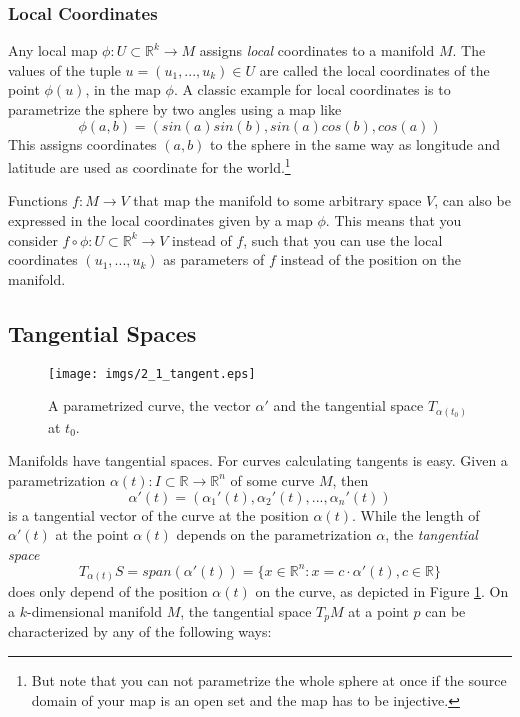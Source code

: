 \subsubsection{Local Coordinates}

Any local map $\phi: U \subset \mathbb R^k \rightarrow M$ assigns \emph{local} coordinates to a manifold $M$. The values of the tuple $u=(u_1,...,u_k)\in U$ are called the local coordinates of the point $\phi(u)$, in the map $\phi$. A classic example for local coordinates is to parametrize the sphere by two angles using a map like
\[\phi(a,b) = (sin(a)sin(b), sin(a)cos(b), cos(a))\]
This assigns coordinates $(a,b)$ to the sphere in the same way as longitude and latitude are used as coordinate for the world.\footnote{But note that you can not parametrize the whole sphere at once if the source domain of your map is an open set and the map has to be injective.}

Functions $f:M \rightarrow V$ that map the manifold to some arbitrary space $V$, can also be expressed in the local coordinates given by  a map $\phi$. This means that you consider $f \circ \phi : U \subset \mathbb R^k \rightarrow V$ instead of $f$, such that you can use the local coordinates $(u_1,...,u_k)$ as parameters of $f$ instead of the position on the manifold. %

	
\subsection{Tangential Spaces}		
\begin{figure}[tb]
\begin{center}
\texttt{[image: imgs/2\_1\_tangent.eps]}
\end{center}
\caption{A parametrized curve, the vector $\alpha'$ and the tangential space $T_{\alpha(t_0)}$ at $t_0$.}
\label{fig::2_1_paramCurve}
\end{figure}


Manifolds have tangential spaces.
For curves calculating tangents is easy. Given a parametrization $\alpha(t): I \subset \mathbb R \to \mathbb R^n$ of some curve $M$, then $$\alpha'(t) = (\alpha_1'(t),\alpha_2'(t),...,\alpha_n'(t))$$ is a tangential vector of the curve at the position $\alpha(t)$. 		While the length of $\alpha'(t)$ at the point $\alpha(t)$ depends on the parametrization $\alpha$,  the \emph{tangential space} $$ T_{\alpha(t)}S = span(\alpha'(t)) = \{x \in \mathbb R^n: x = c \cdot\alpha'(t), c \in \mathbb R\}$$ does only depend of the position $\alpha(t)$ on the curve, as depicted in Figure \ref{fig::2_1_paramCurve}. 
On a $k$-dimensional manifold $M$, the tangential space $T_p M$ at a point $p$ can be characterized by any of the following ways:

